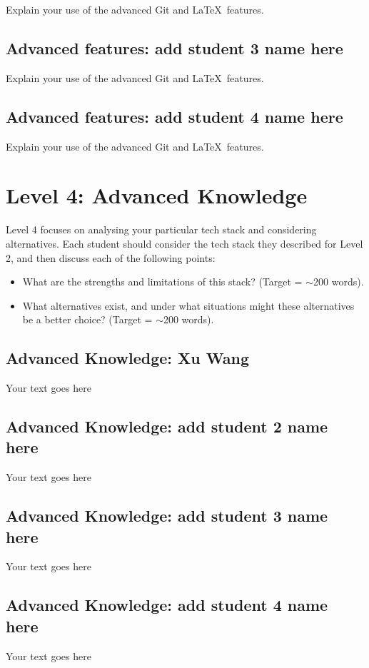 \documentclass[a4paper, 11pt]{report}
\begin{document}
Explain your use of the advanced Git and \LaTeX\ features. 

\subsection{Advanced features: add student 3 name here}

Explain your use of the advanced Git and \LaTeX\ features. 

\subsection{Advanced features: add student 4 name here}

Explain your use of the advanced Git and \LaTeX\ features. 




\newpage
\section{Level 4: Advanced Knowledge}

Level 4 focuses on analysing your particular tech stack and considering alternatives. Each student should consider the tech stack they described for Level 2, and then discuss each of the following points:
\begin{itemize}
    \item What are the strengths and limitations of this stack? (Target = $\sim$200 words).
    \item What alternatives exist, and under what situations might these alternatives be a better choice? (Target = $\sim$200 words).
\end{itemize}	

\subsection{Advanced Knowledge: Xu Wang}

Your text goes here

\subsection{Advanced Knowledge: add student 2 name here}

Your text goes here

\subsection{Advanced Knowledge: add student 3 name here}

Your text goes here

\subsection{Advanced Knowledge: add student 4 name here}

Your text goes here




\newpage




\end{document}
